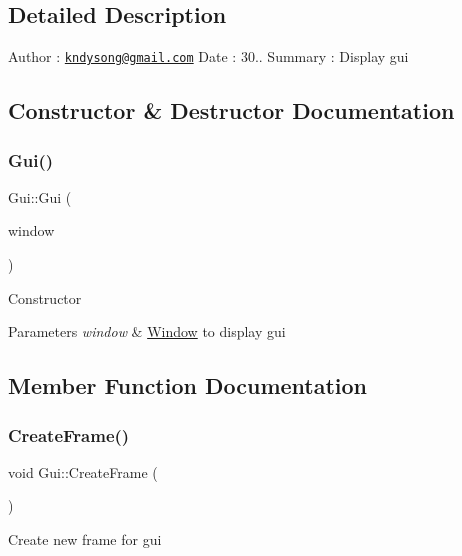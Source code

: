 \subsection{Detailed Description}
Author \+: \href{mailto:kndysong@gmail.com}{\tt kndysong@gmail.\+com} Date \+: 30.. Summary \+: Display gui 

\subsection{Constructor \& Destructor Documentation}
\mbox{\label{class_gui_abd0b1cbb88cee15fb7f1ef3ae5fd8fad}} 
\subsubsection{\texorpdfstring{Gui()}{Gui()}}
{\footnotesize\ttfamily Gui\+::\+Gui (\begin{DoxyParamCaption}\item[{G\+L\+F\+Wwindow $\ast$}]{window }\end{DoxyParamCaption})}



Constructor 


\begin{DoxyParams}{Parameters}
{\em window} & \mbox{\hyperlink{class_window}{Window}} to display gui\\
\hline
\end{DoxyParams}


\subsection{Member Function Documentation}
\mbox{\label{class_gui_a4adb127cac9b23b712d30bed6e127421}} 
\subsubsection{\texorpdfstring{Create\+Frame()}{CreateFrame()}}
{\footnotesize\ttfamily void Gui\+::\+Create\+Frame (\begin{DoxyParamCaption}{ }\end{DoxyParamCaption})}



Create new frame for gui 

\mbox{\label{class_gui_ab8755893515e2f7354e88359a3ac90be}} 

